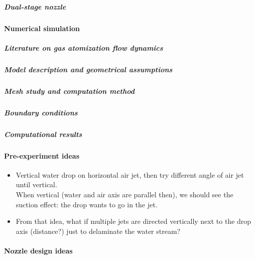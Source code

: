 \documentclass[../../main.tex]{subfiles}
\begin{document}
\subparagraph{Dual-stage nozzle}

\paragraph{Numerical simulation}

\subparagraph{Literature on gas atomization flow dynamics}

\subparagraph{Model description and geometrical assumptions}

\subparagraph{Mesh study and computation method}

\subparagraph{Boundary conditions}

\subparagraph{Computational results}









\paragraph{Pre-experiment ideas}

\begin{itemize}
    \item Vertical water drop on horizontal air jet, then try different angle of air jet until vertical.\\ When vertical (water and air axis are parallel then), we should see the suction effect: the drop wants to go in the jet.
    \item From that idea, what if multiple jets are directed vertically next to the drop axis (distance?) just to delaminate the water stream?\\
\end{itemize}

\paragraph{Nozzle design ideas}
\end{document}
